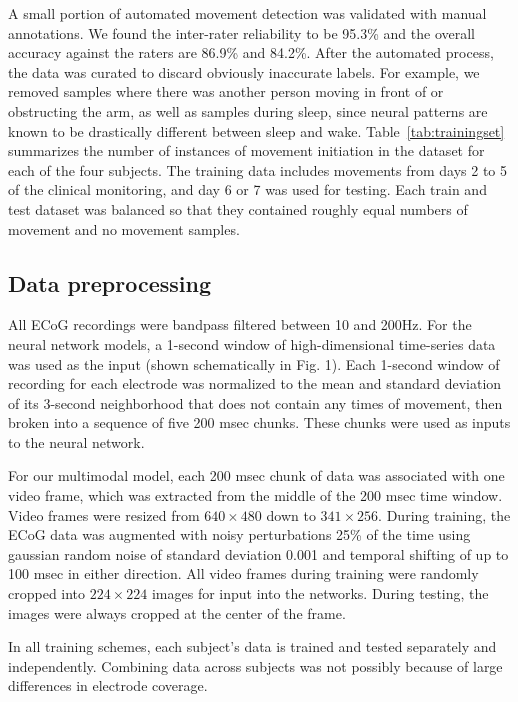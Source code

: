 \documentclass[letterpaper]{article} %
\begin{document}
A small portion of automated movement detection was validated with manual annotations. 
We found the inter-rater reliability to be 95.3\% and the overall accuracy against the raters are 86.9\% and 84.2\%. 
After the automated process, the data was curated to discard obviously inaccurate labels.
For example, we removed samples where there was another person moving in front of or obstructing the arm, as well as samples during sleep, since neural patterns are known to be drastically different between sleep and wake.
Table~\ref{tab:trainingset} summarizes the number of instances of movement initiation in the dataset for each of the four subjects.
The training data includes movements from days 2 to 5 of the clinical monitoring, and day 6 or 7 was used for testing.
Each train and test dataset was balanced so that they contained roughly equal numbers of movement and no movement samples. 

\subsection{Data preprocessing}

All ECoG recordings were bandpass filtered between 10 and 200Hz. 
For the neural network models, a 1-second window of high-dimensional time-series data was used as the input (shown schematically in Fig. 1). Each 1-second window of recording for each electrode was normalized to the mean and standard deviation of its 3-second neighborhood that does not contain any times of movement, then broken into a sequence of five 200 msec chunks. These chunks were used as inputs to the neural network. 

For our multimodal model, each 200 msec chunk of data was associated with one video frame, which was extracted from the middle of the 200 msec time window. Video frames were resized from $640\times480$ down to $341\times256$. During training, the ECoG data was augmented with noisy perturbations 25\% of the time using gaussian random noise of standard deviation 0.001 and temporal shifting of up to 100 msec in either direction. All video frames during training were randomly cropped into $224\times224$ images for input into the networks. During testing, the images were always cropped at the center of the frame. 

In all training schemes, each subject's data is trained and tested separately and independently. Combining data across subjects was not possibly because of large differences in electrode coverage. 
\end{document}
